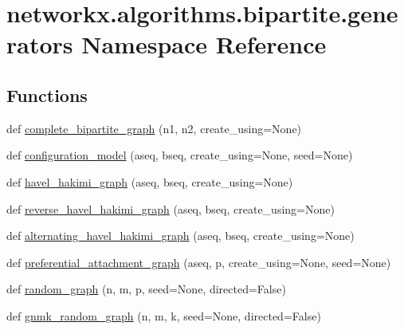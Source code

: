 \hypertarget{namespacenetworkx_1_1algorithms_1_1bipartite_1_1generators}{}\section{networkx.\+algorithms.\+bipartite.\+generators Namespace Reference}
\label{namespacenetworkx_1_1algorithms_1_1bipartite_1_1generators}
\subsection*{Functions}
\begin{DoxyCompactItemize}
\item 
def \hyperlink{namespacenetworkx_1_1algorithms_1_1bipartite_1_1generators_a9db2ac2bb227f430cf8084ccf8821857}{complete\+\_\+bipartite\+\_\+graph} (n1, n2, create\+\_\+using=None)
\item 
def \hyperlink{namespacenetworkx_1_1algorithms_1_1bipartite_1_1generators_a6d634e37c82b2cdc163888bee02b7dff}{configuration\+\_\+model} (aseq, bseq, create\+\_\+using=None, seed=None)
\item 
def \hyperlink{namespacenetworkx_1_1algorithms_1_1bipartite_1_1generators_a305160f75bfa76406ac65ca68f364300}{havel\+\_\+hakimi\+\_\+graph} (aseq, bseq, create\+\_\+using=None)
\item 
def \hyperlink{namespacenetworkx_1_1algorithms_1_1bipartite_1_1generators_ab90b83748f4d4463ff5c4433395feea4}{reverse\+\_\+havel\+\_\+hakimi\+\_\+graph} (aseq, bseq, create\+\_\+using=None)
\item 
def \hyperlink{namespacenetworkx_1_1algorithms_1_1bipartite_1_1generators_ad6dd66c0de01e7cf70a3d9561bc8dd0f}{alternating\+\_\+havel\+\_\+hakimi\+\_\+graph} (aseq, bseq, create\+\_\+using=None)
\item 
def \hyperlink{namespacenetworkx_1_1algorithms_1_1bipartite_1_1generators_adfb011eefdc46e36698351edf275a380}{preferential\+\_\+attachment\+\_\+graph} (aseq, p, create\+\_\+using=None, seed=None)
\item 
def \hyperlink{namespacenetworkx_1_1algorithms_1_1bipartite_1_1generators_ac72f63542228b0d51d526526ee600760}{random\+\_\+graph} (n, m, p, seed=None, directed=False)
\item 
def \hyperlink{namespacenetworkx_1_1algorithms_1_1bipartite_1_1generators_a60074590da46e3abdef5456048742e31}{gnmk\+\_\+random\+\_\+graph} (n, m, k, seed=None, directed=False)
\end{DoxyCompactItemize}


